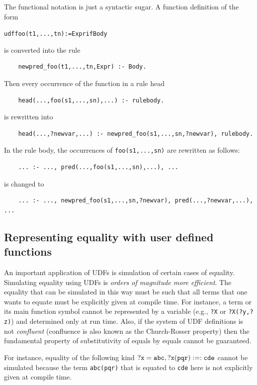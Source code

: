 \documentclass[11pt]{article}
\begin{document}
The functional notation is just a syntactic sugar. A function definition
of the form
\begin{alltt}
    udf foo(t1,...,tn) := Expr if Body
\end{alltt}
is converted into the rule
\begin{verbatim}
    newpred_foo(t1,...,tn,Expr) :- Body.
\end{verbatim}
Then every occurrence of the function in a rule head
\begin{verbatim}
    head(...,foo(s1,...,sn),...) :- rulebody.
\end{verbatim}
is rewritten into
\begin{verbatim}
    head(...,?newvar,...) :- newpred_foo(s1,...,sn,?newvar), rulebody.
\end{verbatim}
In the rule body, the occurrences of \texttt{foo(s1,...,sn)}  are rewritten as
follows:
\begin{verbatim}
    ... :- ..., pred(...,foo(s1,...,sn),...), ...
\end{verbatim}
is changed to
\begin{verbatim}
    ... :- ..., newpred_foo(s1,...,sn,?newvar), pred(...,?newvar,...), ...
\end{verbatim}


\subsection{Representing equality with user defined functions}

An important application of UDFs is simulation of certain cases of
equality.
Simulating equality using UDFs is \emph{orders of magnitude more
  efficient}.  
The equality that can be simulated in this way must be such
that all terms that one wants to equate must be explicitly given at
compile time. For instance, a term or its main function symbol cannot be
represented by a variable (e.g., \texttt{?X} or \texttt{?X(?y,?z)})  and
determined only at run time.
Also, if the system of UDF definitions is not \emph{confluent} 
(confluence is also known as the Church-Rosser property) then
the fundamental property of
substitutivity of equals by equals cannot be guaranteed.


For instance, equality of the following kind $\tt ?x=abc, ?x(pqr) :=: cde$
cannot be simulated because the term \texttt{abc(pqr)} that is equated to
\texttt{cde} here is not explicitly given at compile time.  
\end{document}
